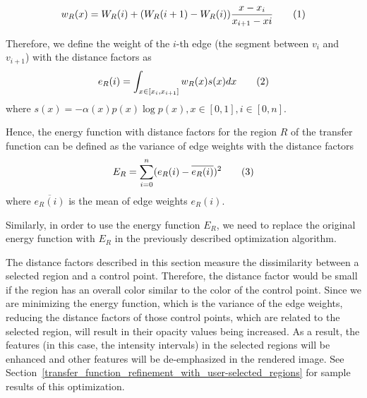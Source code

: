 \[ w_{R}(x)=W_{R}(i) + (W_{R}(i+1)-W_{R}(i))\frac{x-x_{i}}{x_{i+1}-x{i}} 
\addtag \]

Therefore, we define the weight of the $ i $-th edge (the segment between $ v_{i} $ and $ v_{i+1} $) with the distance factors as
\[
e_{R}(i)=\int_{x \in [x_{i}, x_{i+1}]} w_{R}(x)s(x) dx
\addtag \]
where $ s(x)=-\alpha(x)p(x) \log p(x), x \in [0,1], i \in [0,n]$.

Hence, the energy function with distance factors for the region $ R $ of the transfer function can be defined as the variance of edge weights with the distance factors
\[
E_{R}=\sum_{i=0}^{n}(e_{R}(i)-\overline{e_{R}(i)})^{2}
\addtag \]
where $ \overline{e_{R}(i)} $ is the mean of edge weights $e_{R}(i)$.


Similarly, in order to use the energy function $ E_{R} $, we need to replace the original energy function with $ E_{R} $ in the previously described optimization algorithm.


The distance factors described in this section measure the dissimilarity between a selected region and a control point. Therefore, the distance factor would be small if the region has an overall color similar to the color of the control point.
Since we are minimizing the energy function, which is the variance of the edge weights, reducing the distance factors of those control points, which are related to the selected region, will result in their opacity values being increased. As a result, the features (in this case, the intensity intervals) in the selected regions will be enhanced and other features will be de-emphasized in the rendered image.
See Section~\ref{transfer_function_refinement_with_user-selected_regions} for sample results of this optimization.

